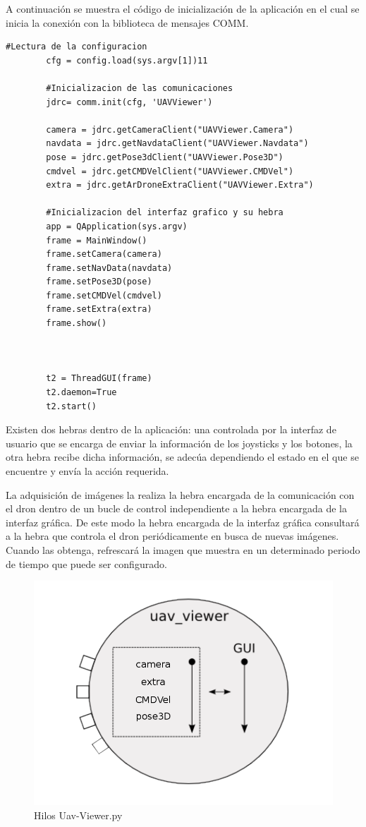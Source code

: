 A continuación se muestra el código de inicialización de la aplicación en el cual se inicia la conexión con la biblioteca de mensajes COMM.

\begin{lstlisting}[frame=single]
		#Lectura de la configuracion
        cfg = config.load(sys.argv[1])11

        #Inicializacion de las comunicaciones
        jdrc= comm.init(cfg, 'UAVViewer')

        camera = jdrc.getCameraClient("UAVViewer.Camera")
        navdata = jdrc.getNavdataClient("UAVViewer.Navdata")
        pose = jdrc.getPose3dClient("UAVViewer.Pose3D")
        cmdvel = jdrc.getCMDVelClient("UAVViewer.CMDVel")
        extra = jdrc.getArDroneExtraClient("UAVViewer.Extra")

		#Inicializacion del interfaz grafico y su hebra
        app = QApplication(sys.argv)
        frame = MainWindow()
        frame.setCamera(camera)
        frame.setNavData(navdata)
        frame.setPose3D(pose)
        frame.setCMDVel(cmdvel)
        frame.setExtra(extra)
        frame.show()



        t2 = ThreadGUI(frame)
        t2.daemon=True
        t2.start()
\end{lstlisting}

Existen dos hebras dentro de la aplicación: una controlada por la interfaz de usuario que se encarga de enviar la información de los joysticks y los botones, la otra hebra recibe dicha información, se adecúa dependiendo el estado en el que se encuentre y envía la acción requerida.

La adquisición de imágenes la realiza la hebra encargada de la comunicación con el dron dentro de un bucle de control independiente a la hebra encargada de la interfaz gráfica.  De este modo la hebra encargada de la interfaz gráfica consultará a la hebra que controla el dron periódicamente en busca de nuevas imágenes. Cuando las obtenga, refrescará la imagen que muestra en un determinado periodo de tiempo que puede ser configurado.

\begin{figure}[H]
  \centering
  \includegraphics[scale=0.3]{imagenes/uavViewer.png}
  \caption{Hilos Uav-Viewer.py}
  \label{fig:uavViewer}
\end{figure}

